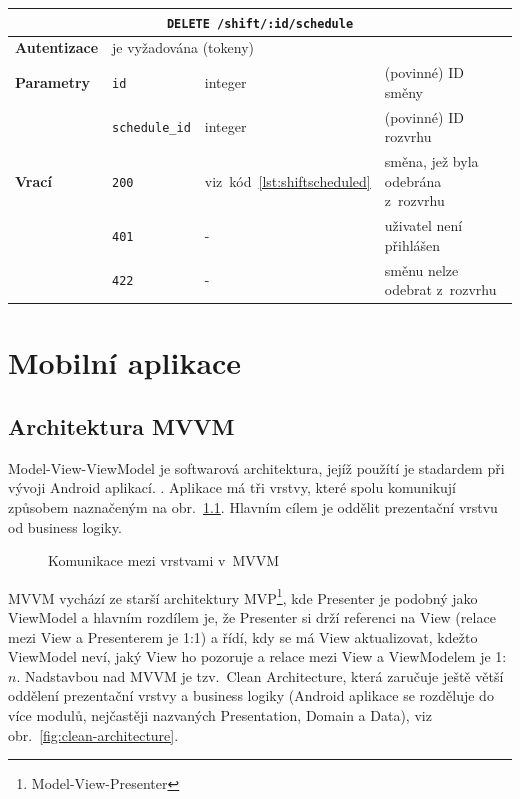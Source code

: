 \documentclass[twoside]{ctuthesis}
\begin{document}
\begin{center}
	\begin{tabular}{p{.19\linewidth}p{.18\linewidth}p{.15\linewidth}p{.35\linewidth}}
		\hline
		\multicolumn{4}{c}{\texttt{DELETE /shift/:id/schedule}}\\
		\hline
		\textbf{Autentizace}  & 	\multicolumn{3}{l}{je vyžadována (tokeny)}\\
		\textbf{Parametry} 		& \texttt{id} & integer & (povinné) ID směny \\
												 	& \texttt{schedule\_id} & integer & (povinné) ID rozvrhu \\
		\textbf{Vrací} 				& \texttt{200} & viz~kód~\ref{lst:shiftscheduled} & směna, jež byla odebrána z~rozvrhu\\
													& \texttt{401} & - & uživatel není přihlášen\\
													& \texttt{422} & - & směnu nelze odebrat z~rozvrhu\\
		\hline
	\end{tabular}
\end{center}

%
\chapter{Mobilní aplikace}
%
\section{Architektura MVVM}

Model-View-ViewModel je softwarová architektura, jejíž použítí je sta\-dar\-dem při vývoji Android aplikací. \cite{android2020guide}. Aplikace má tři vrstvy, které spolu komunikují způsobem naznačeným na obr.~\ref{fig:mvvm}. Hlavním cílem je oddělit prezentační vrstvu od business logiky.  \cite{shekhar2020mvvm}

\begin{figure}[h!]
	
	\caption{Komunikace mezi vrstvami v~MVVM}
	\label{fig:mvvm}
\end{figure}

MVVM vychází ze starší architektury MVP\footnote{Model-View-Presenter}, kde Presenter je podobný jako ViewModel a hlavním rozdílem je, že Presenter si drží referenci na View (relace mezi View a Presenterem je 1:1) a řídí, kdy se má View aktualizovat, kdežto ViewModel neví, jaký View ho pozoruje a relace mezi View a ViewModelem je 1:$n$. \cite{vogel2017android} Nadstavbou nad MVVM je tzv.~Clean Architecture, která zaručuje ještě větší oddělení prezentační vrstvy a business logiky (Android aplikace se rozděluje do více modulů, nejčastěji nazvaných Presentation, Domain a Data), viz obr.~\ref{fig:clean-architecture}. \cite{jain2019kotlin}
\end{document}
